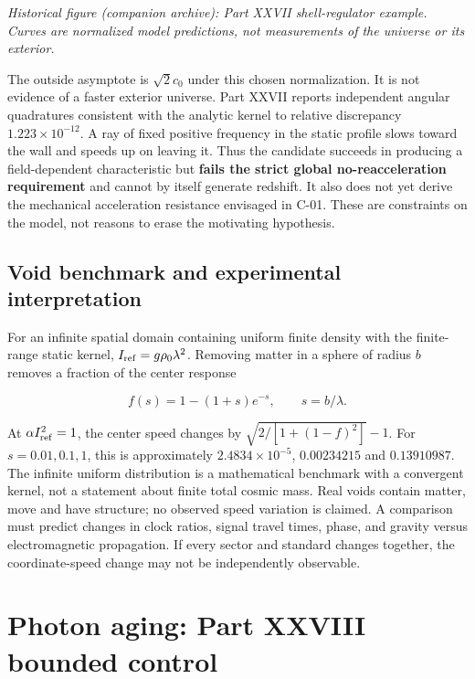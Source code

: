 \documentclass[
  11pt,
  twoside]{article}
\begin{document}
\emph{Historical figure (companion archive): Part XXVII shell-regulator
example. Curves are normalized model predictions, not measurements of
the universe or its exterior.}

The outside asymptote is \(\sqrt2 c_0\) under this chosen normalization.
It is not evidence of a faster exterior universe. Part XXVII reports
independent angular quadratures consistent with the analytic kernel to
relative discrepancy \(1.223\times10^{-12}\). A ray of fixed positive
frequency in the static profile slows toward the wall and speeds up on
leaving it. Thus the candidate succeeds in producing a field-dependent
characteristic but \textbf{fails the strict global no-reacceleration
requirement} and cannot by itself generate redshift. It also does not
yet derive the mechanical acceleration resistance envisaged in C-01.
These are constraints on the model, not reasons to erase the motivating
hypothesis.

\subsection{Void benchmark and experimental
interpretation}\label{void-benchmark-and-experimental-interpretation}

For an infinite spatial domain containing uniform finite density with
the finite-range static kernel, \(I_{\rm ref}=g\rho_0\lambda^2\).
Removing matter in a sphere of radius \(b\) removes a fraction of the
center response

\[f(s)=1-(1+s)e^{-s},\qquad s=b/\lambda.\]

At \(\alpha I_{\rm ref}^2=1\), the center speed changes by
\(\sqrt{2/[1+(1-f)^2]}-1\). For \(s=0.01,0.1,1\), this is approximately
\(2.4834\times10^{-5}\), \(0.00234215\) and \(0.13910987\). The infinite
uniform distribution is a mathematical benchmark with a convergent
kernel, not a statement about finite total cosmic mass. Real voids
contain matter, move and have structure; no observed speed variation is
claimed. A comparison must predict changes in clock ratios, signal
travel times, phase, and gravity versus electromagnetic propagation. If
every sector and standard changes together, the coordinate-speed change
may not be independently observable.

\section{Photon aging: Part XXVIII bounded
control}\label{photon-aging-part-xxviii-bounded-control}
\end{document}
